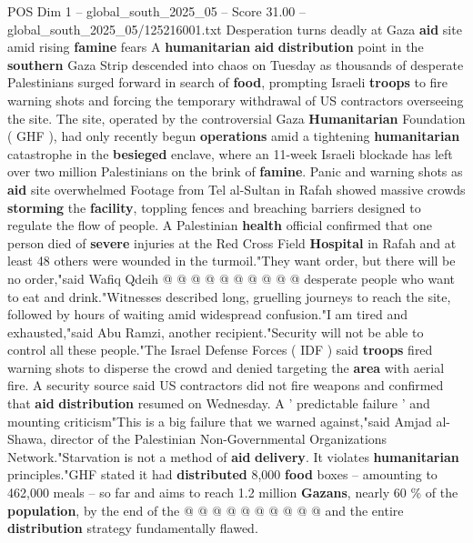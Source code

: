 \begin{textsample}{POS Dim 1 – global\_south\_2025\_05 – Score 31.00 – global\_south\_2025\_05/125216001.txt}  \label{ex:f1_pos_066}
Desperation turns deadly at Gaza \textbf{aid} site amid rising \textbf{famine} fears A \textbf{humanitarian} \textbf{aid} \textbf{distribution} point in the \textbf{southern} Gaza Strip descended into chaos on Tuesday as thousands of desperate Palestinians surged forward in search of \textbf{food}, prompting Israeli \textbf{troops} to fire warning shots and forcing the temporary withdrawal of US contractors overseeing the site.
The site, operated by the controversial Gaza \textbf{Humanitarian} Foundation ( GHF ), had only recently begun \textbf{operations} amid a tightening \textbf{humanitarian} catastrophe in the \textbf{besieged} enclave, where an 11-week Israeli blockade has left over two million Palestinians on the brink of \textbf{famine}.
Panic and warning shots as \textbf{aid} site overwhelmed Footage from Tel al-Sultan in Rafah showed massive crowds \textbf{storming} the \textbf{facility}, toppling fences and breaching barriers designed to regulate the flow of people.
A Palestinian \textbf{health} official confirmed that one person died of \textbf{severe} injuries at the Red Cross Field \textbf{Hospital} in Rafah and at least 48 others were wounded in the turmoil."They want order, but there will be no order,"said Wafiq Qdeih @ @ @ @ @ @ @ @ @ @ desperate people who want to eat and drink."Witnesses described long, gruelling journeys to reach the site, followed by hours of waiting amid widespread confusion."I am tired and exhausted,"said Abu Ramzi, another recipient."Security will not be able to control all these people."The Israel Defense Forces ( IDF ) said \textbf{troops} fired warning shots to disperse the crowd and denied targeting the \textbf{area} with aerial fire.
A security source said US contractors did not fire weapons and confirmed that \textbf{aid} \textbf{distribution} resumed on Wednesday.
A ' predictable failure ' and mounting criticism"This is a big failure that we warned against,"said Amjad al-Shawa, director of the Palestinian Non-Governmental Organizations Network."Starvation is not a method of \textbf{aid} \textbf{delivery}.
It violates \textbf{humanitarian} principles."GHF stated it had \textbf{distributed} 8,000 \textbf{food} boxes -- amounting to 462,000 meals -- so far and aims to reach 1.2 million \textbf{Gazans}, nearly 60 \% of the \textbf{population}, by the end of the @ @ @ @ @ @ @ @ @ @ and the entire \textbf{distribution} strategy fundamentally flawed.

\end{textsample}
